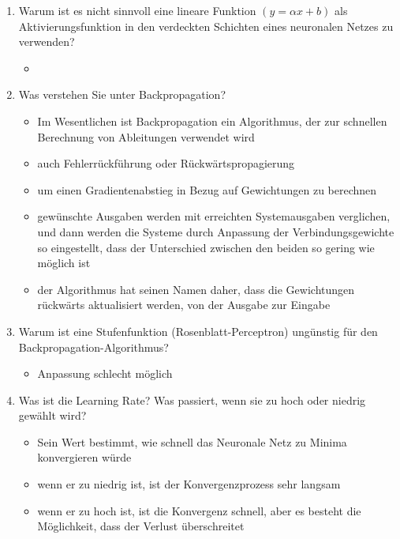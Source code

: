 \documentclass[a4paper,10pt,titlepage]{scrartcl}
\begin{document}
\begin{enumerate}
\begin{itemize}
          \end{itemize}
    \item Warum ist es nicht sinnvoll eine lineare Funktion $(y=\alpha x+b)$ als Aktivierungsfunktion in den verdeckten Schichten eines neuronalen Netzes zu verwenden?
          \begin{itemize}
              \item
          \end{itemize}
    \item Was verstehen Sie unter Backpropagation?
          \begin{itemize}
              \item Im Wesentlichen ist Backpropagation ein Algorithmus, der zur schnellen Berechnung von Ableitungen verwendet wird
              \item auch Fehlerrückführung oder Rückwärtspropagierung
              \item um einen Gradientenabstieg in Bezug auf Gewichtungen zu berechnen
              \item gewünschte Ausgaben werden mit erreichten Systemausgaben verglichen, und dann werden die Systeme durch Anpassung der Verbindungsgewichte so eingestellt, dass der Unterschied zwischen den beiden so gering wie möglich ist
              \item der Algorithmus hat seinen Namen daher, dass die Gewichtungen rückwärts aktualisiert werden, von der Ausgabe zur Eingabe
          \end{itemize}
    \item Warum ist eine Stufenfunktion (Rosenblatt-Perceptron) ungünstig für den Backpropagation-Algorithmus?
          \begin{itemize}
              \item Anpassung schlecht möglich
          \end{itemize}
    \item Was ist die Learning Rate? Was passiert, wenn sie zu hoch oder niedrig gewählt wird?
          \begin{itemize}
              \item Sein Wert bestimmt, wie schnell das Neuronale Netz zu Minima konvergieren würde
              \item wenn er zu niedrig ist, ist der Konvergenzprozess sehr langsam
              \item wenn er zu hoch ist, ist die Konvergenz schnell, aber es besteht die Möglichkeit, dass der Verlust überschreitet
          \end{itemize}

\end{enumerate}
\end{document}
